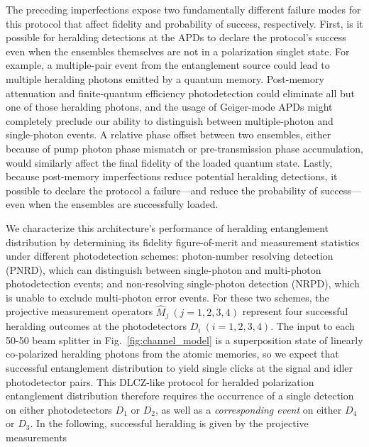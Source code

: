 \documentclass[aps,twocolumn,secnumarabic,amsmath,amssymb,pra,groupedaddress,
showpacs, showkeys]{revtex4-1}
\newcommand{\pna}[1]{\left(#1\right)}
\begin{document}
The preceding imperfections expose two fundamentally different failure modes
for this protocol that affect fidelity and probability of success,
respectively. First, is it possible for heralding detections at the APDs to
declare the protocol's success even when the ensembles themselves are not in a
polarization singlet state. For example, a multiple-pair event from the
entanglement source could lead to multiple heralding photons emitted by a
quantum memory. Post-memory attenuation and finite-quantum efficiency
photodetection could eliminate all but one of those heralding photons, and the
usage of Geiger-mode APDs might completely preclude our ability to distinguish
between multiple-photon and single-photon events. A relative phase offset
between two ensembles, either because of pump photon phase mismatch or
pre-transmission phase accumulation, would similarly affect the final fidelity
of the loaded quantum state. Lastly, because post-memory imperfections reduce
potential heralding detections, it possible to declare the protocol a
failure---and reduce the probability of success---even when the ensembles are
successfully loaded.

We characterize this architecture's performance of heralding entanglement
distribution by determining its fidelity figure-of-merit and measurement
statistics under different photodetection schemes: photon-number resolving
detection (PNRD), which can distinguish between single-photon and multi-photon
photodetection events; and non-resolving single-photon detection (NRPD), which
is unable to exclude multi-photon error events. For these two schemes, the
projective measurement operators $\hat{M}_j~\pna{j=1,2,3,4}$ represent four
successful heralding outcomes at the photodetectors $D_i~\pna{i=1,2,3,4}$. The
input to each 50-50 beam splitter in Fig.~\ref{fig:channel_model} is a
superposition state of linearly co-polarized heralding photons from the atomic
memories, so we expect that successful entanglement distribution to yield
single clicks at the signal and idler photodetector pairs. This DLCZ-like
protocol for heralded polarization entanglement distribution therefore requires
the occurrence of a single detection on either photodetectors $D_1$ or $D_2$,
as well as a \emph{corresponding event} on either $D_4$ or $D_3$. In the
following, successful heralding is given by the projective measurements
\end{document}
